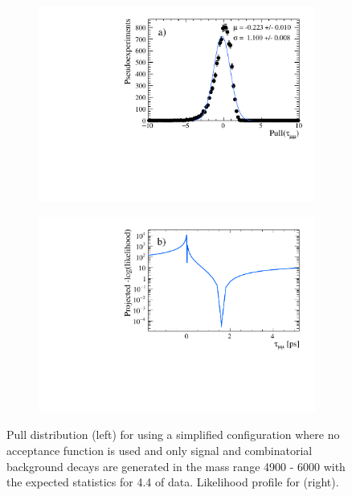 {\begin{figure}[tbp]
    \centering
    \begin{subfigure}[b]{0.49\textwidth}
        \includegraphics[width=  \textwidth]{./Figs/LifetimeMeasurement/CKM_simple_tau_pull.pdf} 
         \label{fig:tau_pull}
    \end{subfigure}
    \begin{subfigure}[b]{0.49\textwidth}
      \includegraphics[width=  \textwidth]{./Figs/LifetimeMeasurement/tau_LL.pdf}  
         \label{fig:tau_ll}
    \end{subfigure}
    \caption{Pull distribution (left) for \tmumu using a simplified configuration where no acceptance function is used and only signal and combinatorial background decays are generated in the mass range 4900 - 6000 \mevcc with the expected statistics for 4.4 \fb of data. Likelihood profile for \tmumu(right).}%
    \label{fig:taupulls}
\end{figure}

}
